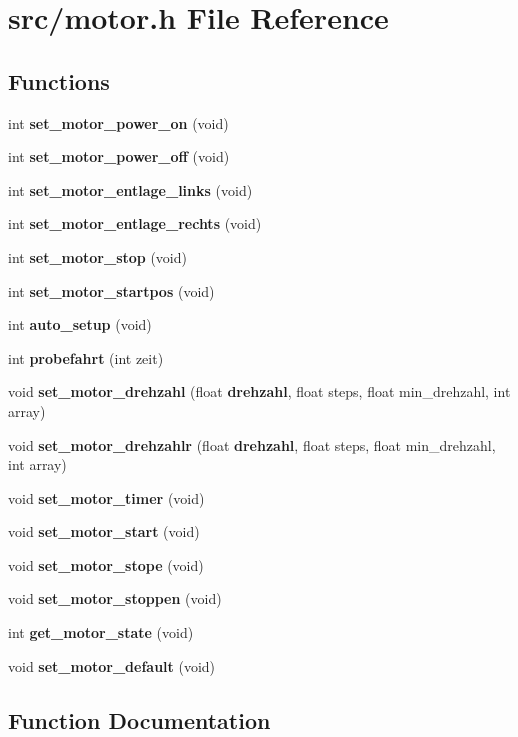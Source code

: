 \section{src/motor.h File Reference}
\label{motor_8h}
\subsection*{Functions}
\begin{DoxyCompactItemize}
\item 
int \textbf{ set\+\_\+motor\+\_\+power\+\_\+on} (void)
\item 
int \textbf{ set\+\_\+motor\+\_\+power\+\_\+off} (void)
\item 
int \textbf{ set\+\_\+motor\+\_\+entlage\+\_\+links} (void)
\item 
int \textbf{ set\+\_\+motor\+\_\+entlage\+\_\+rechts} (void)
\item 
int \textbf{ set\+\_\+motor\+\_\+stop} (void)
\item 
int \textbf{ set\+\_\+motor\+\_\+startpos} (void)
\item 
int \textbf{ auto\+\_\+setup} (void)
\item 
int \textbf{ probefahrt} (int zeit)
\item 
void \textbf{ set\+\_\+motor\+\_\+drehzahl} (float \textbf{ drehzahl}, float steps, float min\+\_\+drehzahl, int array)
\item 
void \textbf{ set\+\_\+motor\+\_\+drehzahlr} (float \textbf{ drehzahl}, float steps, float min\+\_\+drehzahl, int array)
\item 
void \textbf{ set\+\_\+motor\+\_\+timer} (void)
\item 
void \textbf{ set\+\_\+motor\+\_\+start} (void)
\item 
void \textbf{ set\+\_\+motor\+\_\+stope} (void)
\item 
void \textbf{ set\+\_\+motor\+\_\+stoppen} (void)
\item 
int \textbf{ get\+\_\+motor\+\_\+state} (void)
\item 
void \textbf{ set\+\_\+motor\+\_\+default} (void)
\end{DoxyCompactItemize}


\subsection{Function Documentation}
\mbox{\label{motor_8h_a74908ae0608550a6106b2d9348f1cb86}} 
